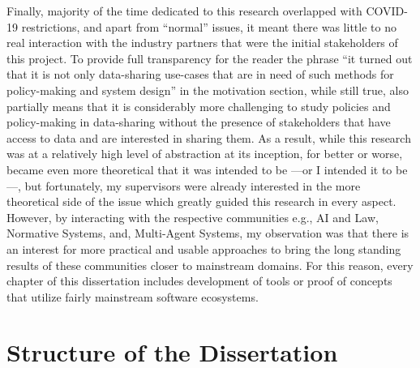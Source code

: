 Finally, majority of the time dedicated to this research overlapped with COVID-19 restrictions, and apart from ``normal'' issues, it meant there was little to no real interaction with the industry partners that were the initial stakeholders of this project. To provide full transparency for the reader the phrase ``it turned out that it is not only data-sharing use-cases that are in need of such methods for policy-making and system design'' in the motivation section, while still true, also partially means that it is considerably more challenging to study policies and policy-making in data-sharing without the presence of stakeholders that have access to data and are interested in sharing them.  As a result, while this research was at a relatively high level of abstraction at its inception, for better or worse, became even more theoretical that it was intended to be ---or I intended it to be---, but fortunately, my supervisors were already interested in the more theoretical side of the issue \cite{Tom,Giovanni} which greatly guided this research in every aspect. However, by interacting with the respective communities e.g., AI and Law, Normative Systems, and, Multi-Agent Systems, my observation was that there is an interest for more practical and usable approaches to bring the long standing results of these communities closer to mainstream domains. For this reason, every chapter of this dissertation includes development of tools or proof of concepts that utilize fairly mainstream software ecosystems.  

\section{Structure of the Dissertation}



